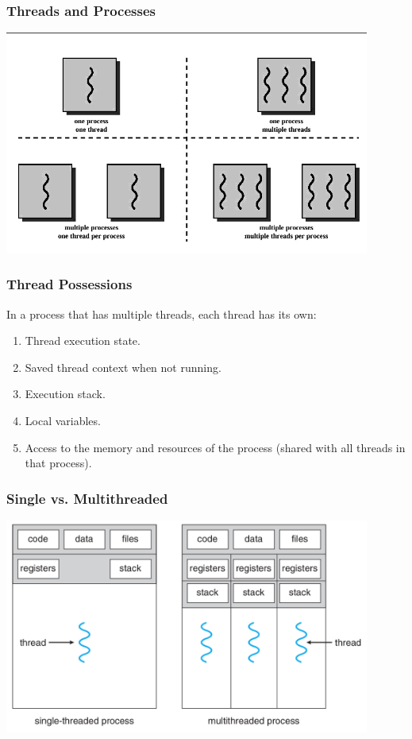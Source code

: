 \begin{frame}
	\frametitle{Threads and Processes}

	\begin{center}
		\includegraphics[width=0.9\textwidth]{images/mthread.png}
	\end{center}

\end{frame}

\begin{frame}
	\frametitle{Thread Possessions}


	In a process that has multiple threads, each thread has its own:
	\begin{enumerate}
		\item Thread execution state.
		\item Saved thread context when not running.
		\item Execution stack.
		\item Local variables.
		\item Access to the memory and resources of the process (shared with all threads in that process).
	\end{enumerate}

\end{frame}

\begin{frame}
	\frametitle{Single vs. Multithreaded}

	\begin{center}
		\includegraphics[width=0.9\textwidth]{images/mthread2.png}
	\end{center}

\end{frame}

